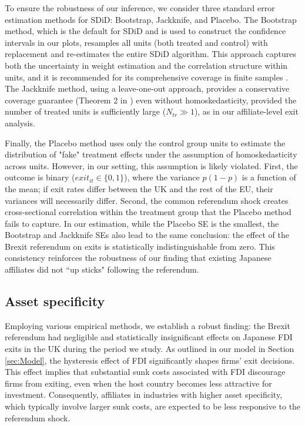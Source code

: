 \documentclass[preprint,11pt,authoryear]{elsarticle}
\begin{document}
To ensure the robustness of our inference, we consider three standard error estimation methods for SDiD: Bootstrap, Jackknife, and Placebo. The Bootstrap method, which is the default for SDiD and is used to construct the confidence intervals in our plots, resamples all units (both treated and control) with replacement and re-estimates the entire SDiD algorithm. This approach captures both the uncertainty in weight estimation and the correlation structure within units, and it is recommended for its comprehensive coverage in finite samples \citep{arkhangelsky2021synthetic}. The Jackknife method, using a leave-one-out approach, provides a conservative coverage guarantee (Theorem 2 in \citealt{arkhangelsky2021synthetic}) even without homoskedasticity, provided the number of treated units is sufficiently large ($N_{tr} \gg 1$), as in our affiliate-level exit analysis. 

Finally, the Placebo method uses only the control group units to estimate the distribution of "fake" treatment effects under the assumption of homoskedasticity across units. However, in our setting, this assumption is likely violated. First, the outcome is binary ($exit_{it} \in \{0, 1\}$), where the variance $p(1-p)$ is a function of the mean; if exit rates differ between the UK and the rest of the EU, their variances will necessarily differ. Second, the common referendum shock creates cross-sectional correlation within the treatment group that the Placebo method fails to capture. In our estimation, while the Placebo SE is the smallest, the Bootstrap and Jackknife SEs also lead to the same conclusion: the effect of the Brexit referendum on exits is statistically indistinguishable from zero. This consistency reinforces the robustness of our finding that existing Japanese affiliates did not ``up sticks" following the referendum.


\subsection{Asset specificity}\label{sec:assetchannel}

Employing various empirical methods, we establish a robust finding: the Brexit referendum had negligible and statistically insignificant effects on Japanese FDI exits in the UK during the period we study. As outlined in our model in Section \ref{sec:Model}, the hysteresis effect of FDI significantly shapes firms' exit decisions. This effect implies that substantial sunk costs associated with FDI discourage firms from exiting, even when the host country becomes less attractive for investment. Consequently, affiliates in industries with higher asset specificity, which typically involve larger sunk costs, are expected to be less responsive to the referendum shock.
\end{document}
